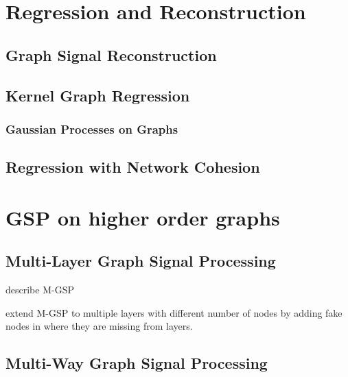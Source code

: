 \section{Regression and Reconstruction}


\subsection{Graph Signal Reconstruction}


\subsection{Kernel Graph Regression}

\subsubsection{Gaussian Processes on Graphs}


\subsection{Regression with Network Cohesion}


\section{GSP on higher order graphs}


\cite{Ji2019}

\cite{Cammoun2009}


\subsection{Multi-Layer Graph Signal Processing}

\cite{Zhang2022} describe M-GSP 

\cite{Zhang2018} extend M-GSP to multiple layers with different number of nodes by adding fake nodes in where they are missing from layers. 
 

\subsection{Multi-Way Graph Signal Processing}


